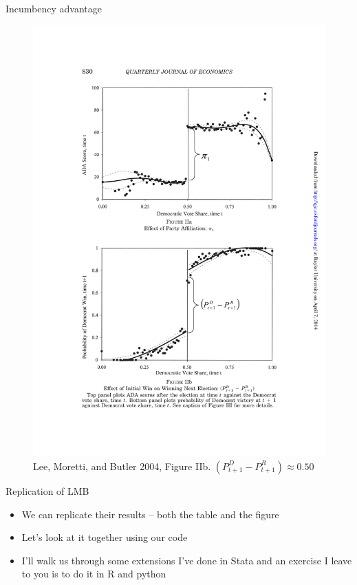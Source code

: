 \documentclass{beamer}
\begin{document}
\begin{frame}{Incumbency advantage}
	
	\begin{figure}
	\includegraphics[scale=0.75]{./lecture_includes/lee_fig2b.pdf}
	\caption{Lee, Moretti, and Butler 2004, Figure IIb. $(P_{t+1}^D - P_{t+1}^R)\approx 0.50$}
	\end{figure}
\end{frame}

\begin{frame}{Replication of LMB}

\begin{itemize}
\item We can replicate their results -- both the table and the figure
\item Let's look at it together using our code
\item I'll walk us through some extensions I've done in Stata and an exercise I leave to you is to do it in R and python
\end{itemize}

\end{frame}
\end{document}
